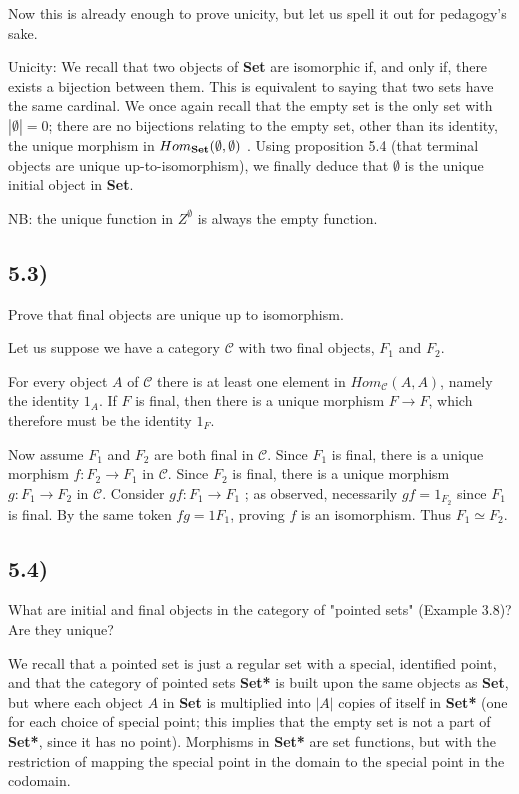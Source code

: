 Now this is already enough to prove unicity, but let us spell it out for pedagogy's sake.

Unicity: We recall that two objects of \textbf{Set} are isomorphic if, and only if, there exists a bijection between them. This is equivalent to saying that two sets have the same cardinal. We once again recall that the empty set is the only set with $|\emptyset| = 0$; there are no bijections relating to the empty set, other than its identity, the unique morphism in $Hom_{\text{\textbf{Set}}}(\emptyset, \emptyset)$ . Using proposition 5.4 (that terminal objects are unique up-to-isomorphism), we finally deduce that $\emptyset$ is the unique initial object in \textbf{Set}.

NB: the unique function in $Z^\emptyset$ is always the empty function.



\subsection*{5.3)}

Prove that final objects are unique up to isomorphism.

Let us suppose we have a category $\mathcal{C}$ with two final objects, $F_1$ and $F_2$.

For every object $A$ of $\mathcal{C}$ there is at least one element in $Hom_{\mathcal{C}} (A, A)$, namely the identity $1_A$. If $F$ is final, then there is a unique morphism $F \to F$, which therefore must be the identity $1_F$.

Now assume $F_1$ and $F_2$ are both final in $\mathcal{C}$. Since $F_1$ is final, there is a unique morphism $f : F_2 \to F_1$ in $\mathcal{C}$. Since $F_2$ is final, there is a unique morphism $g : F_1 \to F_2$ in $\mathcal{C}$. Consider $gf : F_1 \to F_1$ ; as observed, necessarily $gf = 1_{F_2}$
since $F_1$ is final. By the same token $fg = 1{F_1}$, proving $f$ is an isomorphism. Thus $F_1 \simeq F_2$.



\subsection*{5.4)}

What are initial and final objects in the category of "pointed sets" (Example 3.8)? Are they unique?

We recall that a pointed set is just a regular set with a special, identified point, and that the category of pointed sets \textbf{Set*} is built upon the same objects as \textbf{Set}, but where each object $A$ in \textbf{Set} is multiplied into $|A|$ copies of itself in \textbf{Set*} (one for each choice of special point; this implies that the empty set is not a part of \textbf{Set*}, since it has no point). Morphisms in \textbf{Set*} are set functions, but with the restriction of mapping the special point in the domain to the special point in the codomain.


